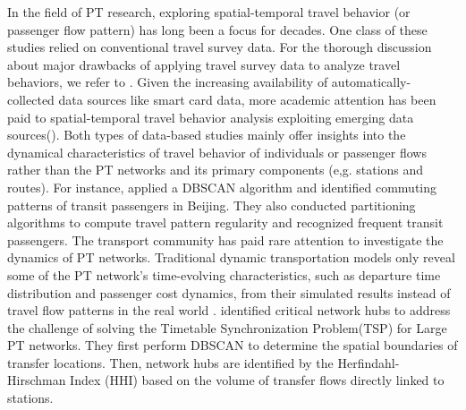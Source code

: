 \documentclass[a4paper,fleqn]{cas-sc}
\begin{document}
In the field of PT research, exploring spatial-temporal travel behavior (or passenger flow pattern) has long been a focus for decades. One class of these studies relied on conventional travel survey data\citep{recker1985travel,hanson1988systematic,pas1995intrapersonal,joh2002activity,susilo2005analysis}. For the thorough discussion about major drawbacks of applying travel survey data to analyze travel behaviors, we refer to \cite{tao2014examining}. Given the increasing availability of automatically-collected data sources like smart card data, more academic attention has been paid to spatial-temporal travel behavior analysis exploiting emerging data sources(\citep{morency2007measuring,ortega2013classification,6981952,ouyang2018passenger}). Both types of data-based studies mainly offer insights into the dynamical characteristics of travel behavior of individuals or passenger flows rather than the PT networks and its primary components (e,g. stations and routes). For instance, \cite{ma2013mining} applied a DBSCAN algorithm and identified commuting patterns of transit passengers in Beijing. They also conducted partitioning algorithms to compute travel pattern regularity and recognized frequent transit passengers. The transport community has paid rare attention to investigate the dynamics of PT networks. Traditional dynamic transportation models only reveal some of the PT network's time-evolving characteristics, such as departure time distribution and passenger cost dynamics, from their simulated results instead of travel flow patterns in the real world \citep{hamdouch2011schedule,ma2011hybrid,nuzzolo2012schedule,yao2013modeling}. \cite{yap2019shall} identified critical network hubs to address the challenge of solving the Timetable Synchronization Problem(TSP) for Large PT networks. They first perform DBSCAN to determine the spatial boundaries of transfer locations. Then, network hubs are identified by the Herfindahl- Hirschman Index (HHI) based on the volume of transfer flows directly linked to stations.
\end{document}
